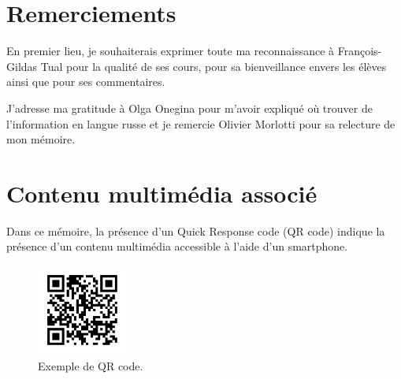 
\section*{Remerciements}

En premier lieu, je souhaiterais exprimer toute ma reconnaissance à François-Gildas
Tual pour la qualité de ses cours, pour sa bienveillance envers les élèves ainsi
que pour ses commentaires.

J'adresse ma gratitude à Olga Onegina pour m’avoir expliqué où trouver de
l'information en langue russe et je remercie Olivier Morlotti pour sa relecture
de mon mémoire.


\vspace{4.0cm}


\section*{Contenu multimédia associé}

Dans ce mémoire, la présence d'un Quick Response code (QR code) indique la
présence d'un contenu multimédia accessible à l'aide d'un smartphone.

\begin{figure}[!ht]
  \begin{bigcenter}
    \includegraphics[width=3cm, keepaspectratio]{qr-cover.pdf}
  \end{bigcenter}
  \caption{Exemple de QR code.}
\end{figure}


